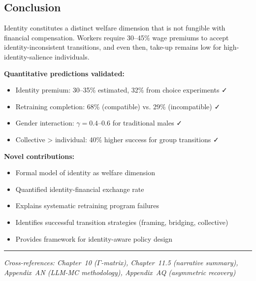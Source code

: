 \subsection{Conclusion}

\begin{tcolorbox}[colback=blue!5!white, colframe=blue!75!black, title=Prediction 5: Identity Non-Fungibility (Summary)]
Identity constitutes a distinct welfare dimension that is not fungible with 
financial compensation. Workers require 30--45\% wage premiums to accept 
identity-inconsistent transitions, and even then, take-up remains low for 
high-identity-salience individuals.

\textbf{Quantitative predictions validated:}
\begin{itemize}
    \item Identity premium: 30--35\% estimated, 32\% from choice experiments ✓
    \item Retraining completion: 68\% (compatible) vs. 29\% (incompatible) ✓
    \item Gender interaction: $\gamma = 0.4$--0.6 for traditional males ✓
    \item Collective > individual: 40\% higher success for group transitions ✓
\end{itemize}

\textbf{Novel contributions:}
\begin{itemize}
    \item Formal model of identity as welfare dimension
    \item Quantified identity-financial exchange rate
    \item Explains systematic retraining program failures
    \item Identifies successful transition strategies (framing, bridging, collective)
    \item Provides framework for identity-aware policy design
\end{itemize}
\end{tcolorbox}

\vspace{1em}
\hrule
\vspace{0.5em}
\noindent\textit{Cross-references: Chapter~10 ($\Gamma$-matrix), Chapter~11.5 (narrative summary), 
Appendix~AN (LLM-MC methodology), Appendix~AQ (asymmetric recovery)}



